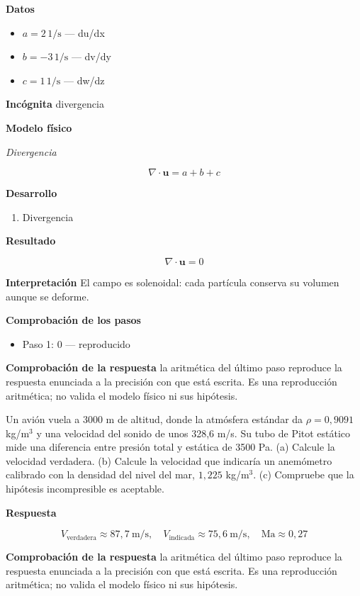 \documentclass[10pt,openany]{book}
\begin{document}
\noindent\textbf{Datos}
\begin{itemize}
\item $a = 2\,\mathrm{1/s}$ — du/dx
\item $b = -3\,\mathrm{1/s}$ — dv/dy
\item $c = 1\,\mathrm{1/s}$ — dw/dz
\end{itemize}

\noindent\textbf{Incógnita}
divergencia

\noindent\textbf{Modelo físico}

\noindent\textit{Divergencia}

\[
\nabla\cdot\mathbf{u} = a + b + c
\]

\noindent\textbf{Desarrollo}
\begin{enumerate}
\item
Divergencia
\end{enumerate}

\noindent\textbf{Resultado}

\[
\nabla\cdot\mathbf{u} = 0
\]

\noindent\textbf{Interpretación}
El campo es solenoidal: cada partícula conserva su volumen aunque se deforme.

\noindent\textbf{Comprobación de los pasos}
\begin{itemize}
\item Paso 1: $0$ — reproducido
\end{itemize}

\noindent\textbf{Comprobación de la respuesta} la aritmética del último paso reproduce la respuesta enunciada a la precisión con que está escrita. Es una reproducción aritmética; no valida el modelo físico ni sus hipótesis.

Un avión vuela a 3000 m de altitud, donde la atmósfera estándar da \(\rho = 0{,}9091\) kg/m\(^3\) y una velocidad del sonido de unos 328,6 m/s. Su tubo de Pitot estático mide una diferencia entre presión total y estática de 3500 Pa. (a) Calcule la velocidad verdadera. (b) Calcule la velocidad que indicaría un anemómetro calibrado con la densidad del nivel del mar, \(1{,}225\) kg/m\(^3\). (c) Compruebe que la hipótesis incompresible es aceptable.

\noindent\textbf{Respuesta}

\[
V_{\mathrm{verdadera}} \approx 87{,}7\ \mathrm{m/s},\quad V_{\mathrm{indicada}} \approx 75{,}6\ \mathrm{m/s},\quad \mathrm{Ma} \approx 0{,}27
\]

\noindent\textbf{Comprobación de la respuesta} la aritmética del último paso reproduce la respuesta enunciada a la precisión con que está escrita. Es una reproducción aritmética; no valida el modelo físico ni sus hipótesis.
\end{document}

